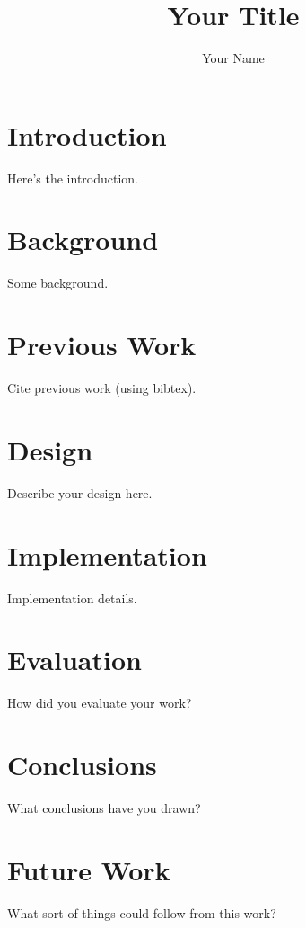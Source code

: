 \documentclass[MSc,12pt]{wsuthesis}
\begin{document}
\title{Your Title}

\author{Your Name}


\centerhdrstrue
\strhdrstrue





\dedication{
  This is dedicated to ... (optional)
}

\preface

\chapter{Introduction}

Here's the introduction.

\chapter{Background}

Some background.

\chapter{Previous Work}

Cite previous work (using bibtex).

\chapter{Design}

Describe your design here.

\chapter{Implementation}

Implementation details.

\chapter{Evaluation}

How did you evaluate your work?

\chapter{Conclusions}

What conclusions have you drawn?

\chapter{Future Work}

What sort of things could follow from this work?

\newpage
\singlespacing



\appendix
% 
\end{document}
